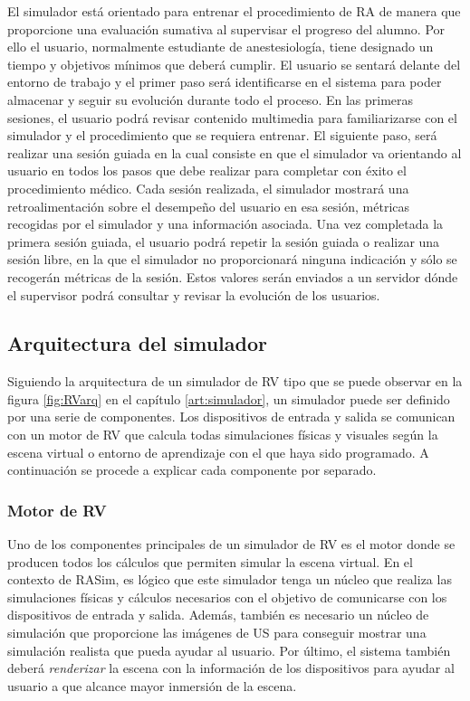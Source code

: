 El simulador está orientado para entrenar el procedimiento de \ac{RA} de manera que proporcione una evaluación sumativa al supervisar el progreso del alumno. Por ello el usuario, normalmente estudiante de anestesiología, tiene designado un tiempo y objetivos mínimos que deberá cumplir. El usuario se sentará delante del entorno de trabajo y el primer paso será identificarse en el sistema para poder almacenar y seguir su evolución durante todo el proceso. En las primeras sesiones, el usuario podrá revisar contenido multimedia para familiarizarse con el simulador y el procedimiento que se requiera entrenar. El siguiente paso, será realizar una sesión guiada en la cual consiste en que el simulador va orientando al usuario en todos los pasos que debe realizar para completar con éxito el procedimiento médico. Cada sesión realizada, el simulador mostrará una retroalimentación sobre el desempeño del usuario en esa sesión, métricas recogidas por el simulador y una información asociada.
Una vez completada la primera sesión guiada, el usuario podrá repetir la sesión guiada o realizar una sesión libre, en la que el simulador no proporcionará ninguna indicación y sólo se recogerán métricas de la sesión. Estos valores serán enviados a un servidor dónde el supervisor podrá consultar y revisar la evolución de los usuarios.


\subsection{Arquitectura del simulador}
\label{rasim:arqrasim}
Siguiendo la arquitectura de un simulador de \ac{RV} tipo que se puede observar en la figura \ref{fig:RVarq}  en el capítulo \ref{art:simulador}, un simulador puede ser definido por una serie de componentes. Los dispositivos de entrada y salida se comunican con un motor de \ac{RV} que calcula todas simulaciones físicas y visuales según la escena virtual o entorno de aprendizaje con el que haya sido programado. A continuación se procede a explicar cada componente por separado. 

\subsubsection{Motor de \ac{RV}}

Uno de los componentes principales de un simulador de \ac{RV} es el motor donde se producen todos los cálculos que permiten simular la escena virtual. 
En el contexto de \ac{RASim}, es lógico que este simulador tenga un núcleo que realiza las simulaciones físicas y cálculos necesarios con el objetivo de comunicarse con los dispositivos de entrada y salida. Además, también es necesario un núcleo de simulación que proporcione las imágenes de \ac{US} para conseguir mostrar una simulación realista que pueda ayudar al usuario. Por último, el sistema también deberá \emph{renderizar} la escena con la información de los dispositivos para ayudar al usuario a que alcance mayor inmersión de la escena. 

